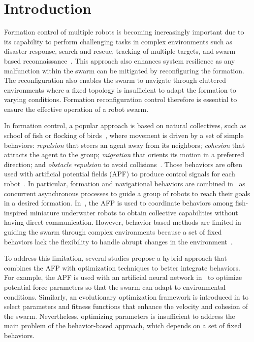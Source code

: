 \section{Introduction}
Formation control of multiple robots is becoming increasingly important due to its capability to perform challenging tasks in complex environments such as disaster response, search and rescue, tracking of multiple targets, and swarm-based reconnaissance~\cite{9306908,Oh2015}. This approach also enhances system resilience as any malfunction within the swarm can be mitigated by reconfiguring the formation. The reconfiguration also enables the swarm to navigate through cluttered environments where a fixed topology is insufficient to adapt the formation to varying conditions. Formation reconfiguration control therefore is essential to ensure the effective operation of a robot swarm.

In formation control, a popular approach is based on natural collectives, such as school of fish or flocking of birds~\cite {Nagy2010}, where movement is driven by a set of simple behaviors: \textit{repulsion} that steers an agent away from its neighbors; \textit{cohesion} that attracts the agent to the group; \textit{migration} that orients its motion in a preferred direction; and \textit{obstacle repulsion} to avoid collisions~\cite{Reynolds1987}. Those behaviors are often used with artificial potential fields (APF) to produce control signals for each robot~\cite{736776,Berlinger2021,9565893, 7434587}. In particular, formation and navigational behaviors are combined in~\cite{736776} as concurrent asynchronous processes to guide a group of robots to reach their goals in a desired formation. In~\cite{Berlinger2021}, the AFP is used to coordinate behaviors among fish-inspired miniature underwater robots to obtain  
collective capabilities without having direct communication. However, behavior-based methods are limited in guiding the swarm through complex environments because a set of fixed behaviors lack the flexibility to handle abrupt changes in the environment~\cite{Zhang2023}.

To address this limitation, several studies propose a hybrid approach that combines the AFP with optimization techniques to better integrate behaviors. For example, the APF is used with an artificial neural network in~\cite{Elkilany2020} to optimize potential force parameters so that the swarm can adapt to environmental conditions. Similarly, an evolutionary optimization framework is introduced in \cite{Vsrhelyi2018} to select parameters and fitness functions that enhance the velocity and cohesion of the swarm. Nevertheless, optimizing parameters is insufficient to address the main problem of the behavior-based approach, which depends on a set of fixed behaviors. 

